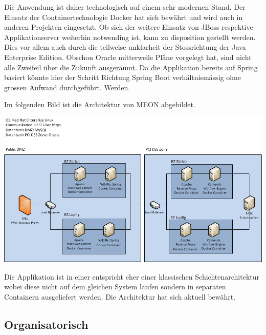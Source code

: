 Die Anwendung ist daher technologisch auf einem sehr modernen Stand. Der Einsatz der Containertechnologie Docker hat sich bewährt und wird auch in anderen Projekten eingesetzt. Ob sich der weitere Einsatz von JBoss respektive Applikationserver weiterhin notwending ist, kann zu disposition gestellt werden. Dies vor allem auch durch die teilweise unklarheit der Stossrichtung der Java Enterprise Edition. Obschon Oracle mitterweile Pläne vorgelegt hat, sind nicht alle Zweifeil über die Zukunft ausgeräumt. Da die Applikation bereits auf Spring basiert könnte hier der Schritt Richtung Spring Boot verhältnismässig ohne grossen Aufwand durchgeführt. Werden.

Im folgenden Bild ist die Architektur von MEON abgebildet.

\begin{center}
	\includegraphics[scale=0.55]{meon_arch.png}
\end{center}

Die Applikation ist in einer entspricht eher einer klassischen Schichtenarchitektur wobei diese nicht auf dem gleichen System laufen sondern in separaten Containern ausgeliefert werden. Die Architektur hat sich aktuell bewährt. 

\subsection{Organisatorisch}

